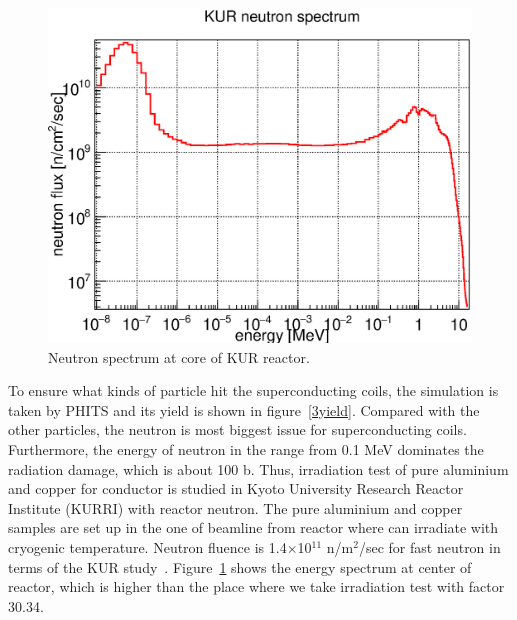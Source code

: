   \begin{figure}[H]
    \centering
	\includegraphics[scale=0.46]{chapter5/fig/neutron.eps}
   \caption{Neutron spectrum at core of KUR reactor.}
   \label{4dpa}
  \end{figure}
To ensure what kinds of particle hit the superconducting coils, the simulation is taken by PHITS and its yield is shown in figure~\ref{3yield}.
Compared with the other particles, the neutron is most biggest issue for superconducting coils.
Furthermore, the energy of neutron in the range from 0.1 MeV dominates the radiation damage, which is about 100 b.
Thus, irradiation test of pure aluminium and copper for conductor is studied in Kyoto University Research Reactor Institute (KURRI) with reactor neutron.
The pure aluminium and copper samples are set up in the one of beamline from reactor where can irradiate with cryogenic temperature.
Neutron fluence is 1.4$\times$10$^{11}$ n/m$^2$/sec for fast neutron in terms of the KUR study~\cite{kur}.
Figure~\ref{4dpa} shows the energy spectrum at center of reactor, which is higher than the place where we take irradiation test with factor 30.34.

